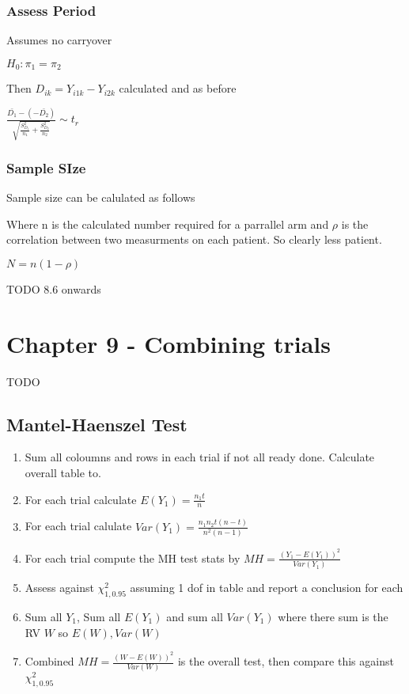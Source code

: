 \documentclass[
  letterpaper,
  DIV=11,
  numbers=noendperiod]{scrreprt}
\providecommand{\tightlist}{%
  \setlength{\itemsep}{0pt}\setlength{\parskip}{0pt}}\usepackage{longtable,booktabs,array}
\begin{document}
\hypertarget{assess-period}{%
\subsubsection{Assess Period}\label{assess-period}}

Assumes no carryover

\(H_0 : \pi_1 = \pi_2\)

Then \(D_{ik} = Y_{i1k} - Y_{i2k}\) calculated and as before

\(\frac{\bar{D_1} - (-\bar{D_2})} {\sqrt{  \frac{S^2_{D_1}}{n_1} +  \frac{S^2_{D_2}}{n_2} }} \sim t_r\)

\hypertarget{sample-size}{%
\subsubsection{Sample SIze}\label{sample-size}}

Sample size can be calulated as follows

Where n is the calculated number required for a parrallel arm and
\(\rho\) is the correlation between two measurments on each patient. So
clearly less patient.

\(N = n(1-\rho)\)

TODO 8.6 onwards

\hypertarget{chapter-9---combining-trials}{%
\section{Chapter 9 - Combining
trials}\label{chapter-9---combining-trials}}

TODO

\hypertarget{mantel-haenszel-test}{%
\subsection{Mantel-Haenszel Test}\label{mantel-haenszel-test}}

\begin{enumerate}
\def\labelenumi{\arabic{enumi})}
\tightlist
\item
  Sum all coloumns and rows in each trial if not all ready done.
  Calculate overall table to.
\item
  For each trial calculate \(E(Y_1) = \frac{n_1 t}{n}\)
\item
  For each trial calulate \(Var(Y_1) = \frac{n_1 n_2 t(n-t)}{n^2(n-1)}\)
\item
  For each trial compute the MH test stats by
  \(MH = \frac{(Y_1 - E(Y_1))^2}{Var(Y_1)}\)
\item
  Assess against \(\chi^2_{1,0.95}\) assuming 1 dof in table and report
  a conclusion for each
\item
  Sum all \(Y_1\), Sum all \(E(Y_1)\) and sum all \(Var(Y_1)\) where
  there sum is the RV \(W\) so \(E(W), Var(W)\)
\item
  Combined \(MH = \frac{(W - E(W))^2}{Var(W)}\) is the overall test,
  then compare this against \(\chi^2_{1,0.95}\)
\end{enumerate}
\end{document}
